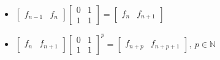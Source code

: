 \begin{itemize}

    \item $\begin{bmatrix} f_{n-1} & f_n \end{bmatrix}
           \begin{bmatrix} 0 & 1 \\ 1 & 1 \end{bmatrix} =
           \begin{bmatrix} f_n & f_{n+1} \end{bmatrix}$
    \item $\begin{bmatrix} f_n & f_{n+1} \end{bmatrix}
            {\begin{bmatrix} 0 & 1 \\ 1 & 1 \end{bmatrix}}^p =
            \begin{bmatrix} f_{n+p} & f_{n+p+1} \end{bmatrix},
            \ p \in \mathbb{N}$
\end{itemize}